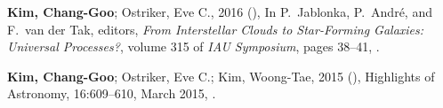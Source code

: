 \item \textbf{Kim, Chang-Goo}; Ostriker, Eve C., 2016 (), In P.~{Jablonka},
  P.~{Andr{\'e}}, and F.~{van der Tak}, editors, {\em From Interstellar Clouds
  to Star-Forming Galaxies: Universal Processes?}, volume 315 of {\em IAU
  Symposium}, pages 38--41, .
\item \textbf{Kim, Chang-Goo}; Ostriker, Eve C.; Kim, Woong-Tae, 2015 (),
  Highlights of Astronomy, 16:609--610, March 2015, .